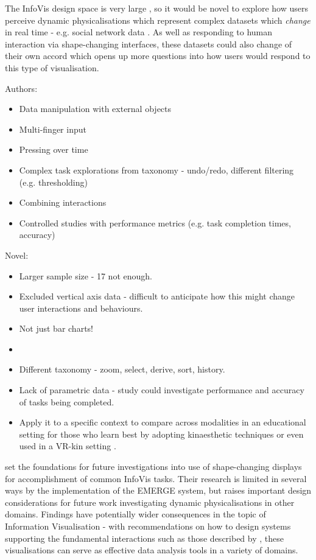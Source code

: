 \documentclass[11pt]{article}
\begin{document}
The InfoVis design space is very large \citep{card1997}, so it would be novel to explore how users perceive dynamic physicalisations which represent complex datasets which \textit{change} in real time - e.g. social network data \citep{federico2011}. As well as responding to human interaction via shape-changing interfaces, these datasets could also change of their own accord which opens up more questions into how users would respond to this type of visualisation.

Authors:
\begin{itemize}
\item Data manipulation with external objects
\item Multi-finger input
\item Pressing over time
\item Complex task explorations from taxonomy - undo/redo, different filtering (e.g. thresholding)
\item Combining interactions
\item Controlled studies with performance metrics (e.g. task completion times, accuracy)
\end{itemize}

Novel:
\begin{itemize}
\item Larger sample size - 17 not enough.
\item Excluded vertical axis data - difficult to anticipate how this might change user interactions and behaviours.
\item Not just bar charts!
\item 
\item Different taxonomy - zoom, select, derive, sort, history.
\item Lack of parametric data - study could investigate performance and accuracy of tasks being completed.
\item Apply it to a specific context to compare across modalities in an educational setting for those who learn best by adopting kinaesthetic techniques \citep{gilakjani2011} or even used in a VR-kin setting \citep{tennent2017}.
\end{itemize}

\citet{taher2015} set the foundations for future investigations into use of shape-changing displays for accomplishment of common InfoVis tasks. Their research is limited in several ways by the implementation of the EMERGE system, but raises important design considerations for future work investigating dynamic physicalisations in other domains. Findings have potentially wider consequences in the topic of Information Visualisation - with recommendations on how to design systems supporting the fundamental interactions such as those described by \citet{heer2012}, these visualisations can serve as effective data analysis tools in a variety of domains.


\newpage
\small

\normalsize
\end{document}
